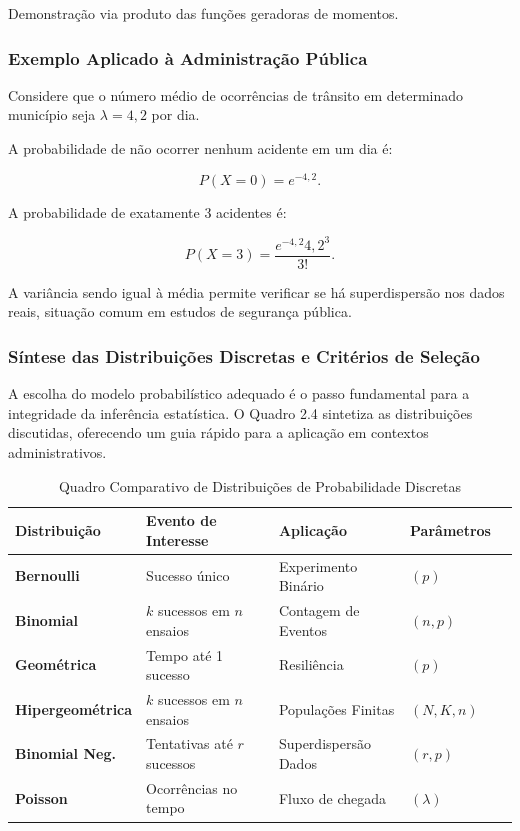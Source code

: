 Demonstração via produto das funções geradoras de momentos.


\subsubsection*{Exemplo Aplicado à Administração Pública}

Considere que o número médio de ocorrências de trânsito
em determinado município seja $\lambda=4,2$ por dia. \vskip0.3cm

A probabilidade de não ocorrer nenhum acidente em um dia é:

\[
P(X=0)
=
e^{-4,2}.
\]

A probabilidade de exatamente 3 acidentes é:

\[
P(X=3)
=
\frac{e^{-4,2}4,2^3}{3!}.
\]

A variância sendo igual à média permite verificar
se há superdispersão nos dados reais,
situação comum em estudos de segurança pública.

\newpage
\subsubsection{Síntese das Distribuições Discretas e Critérios de Seleção}

A escolha do modelo probabilístico adequado é o passo fundamental para a integridade da inferência estatística. O Quadro 2.4 sintetiza as distribuições discutidas, oferecendo um guia rápido para a aplicação em contextos administrativos.

\begin{table}[H]
\centering\caption{Quadro Comparativo de Distribuições de Probabilidade Discretas}
\label{tab:resumo_discretas}
\small
\begin{tabularx}{\textwidth}{l|l|l|p{4.5cm}|c}
\hline \hline
\textbf{Distribuição}     & \textbf{Evento de Interesse} & \textbf{Aplicação}         & \textbf{Pa\-râ\-me\-tros}   \\ 
\hline \hline
\textbf{Bernoulli}        & Sucesso único                & Experimento Binário        & $(p)$                 \\
\textbf{Binomial}         & $k$ sucessos em $n$ ensaios  & Contagem de Eventos        & $(n, p)$             \\
\textbf{Geométrica}      & Tempo até 1\textordmasculine{} sucesso          & Resiliência                & $(p)$                \\
\textbf{Hipergeométrica} & $k$ sucessos em $n$ ensaios   & Populações Finitas         & $(N, K, n)$          \\
\textbf{Binomial Neg.}   & Tentativas até $r$ sucessos   & Superdispersão Dados       & $(r, p)$             \\
\textbf{Poisson}         & Ocorrências no tempo          & Fluxo de chegada           & $(\lambda)$          \\
\hline \hline
\end{tabularx}
\end{table}

